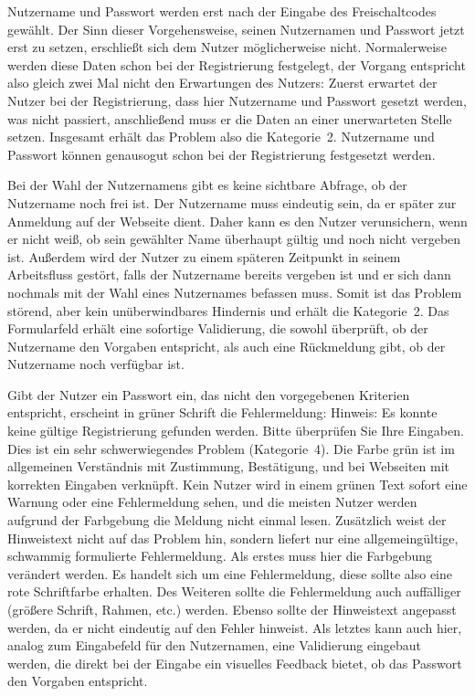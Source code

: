 {
Nutzername und Passwort werden erst nach der Eingabe des Freischaltcodes gewählt. 
}
{
Der Sinn dieser Vorgehensweise, seinen Nutzernamen und Passwort jetzt erst zu setzen, erschließt sich dem Nutzer möglicherweise nicht. Normalerweise werden diese Daten schon bei der Registrierung festgelegt, der Vorgang entspricht also gleich zwei Mal nicht den Erwartungen des Nutzers: Zuerst erwartet der Nutzer bei der Registrierung, dass hier Nutzername und Passwort gesetzt werden, was nicht passiert, anschließend muss er die Daten an einer unerwarteten Stelle setzen. Insgesamt erhält das Problem also die Kategorie~2.
}
{
Nutzername und Passwort können genausogut schon bei der Registrierung festgesetzt werden.
}
\label{prob:frei:nutzerundpw}

{
Bei der Wahl der Nutzernamens gibt es keine sichtbare Abfrage, ob der Nutzername noch frei ist.
}
{
Der Nutzername muss eindeutig sein, da er später zur Anmeldung auf der Webseite dient. Daher kann es den Nutzer verunsichern, wenn er nicht weiß, ob sein gewählter Name überhaupt gültig und noch nicht vergeben ist. Außerdem wird der Nutzer zu einem späteren Zeitpunkt in seinem Arbeitsfluss gestört, falls der Nutzername bereits vergeben ist und er sich dann nochmals mit der Wahl eines Nutzernames befassen muss. Somit ist das Problem störend, aber kein unüberwindbares Hindernis und erhält die Kategorie~2.
}
{
Das Formularfeld erhält eine sofortige Validierung, die sowohl überprüft, ob der Nutzername den Vorgaben entspricht, als auch eine Rückmeldung gibt, ob der Nutzername noch verfügbar ist.
}
\label{prob:frei:nutzerverfuegbar}

{
Gibt der Nutzer ein Passwort ein, das nicht den vorgegebenen Kriterien entspricht, erscheint in grüner Schrift die Fehlermeldung: \glqq Hinweis: Es konnte keine gültige Registrierung gefunden werden. Bitte überprüfen Sie Ihre Eingaben.\grqq
}
{
Dies ist ein sehr schwerwiegendes Problem (Kategorie~4). Die Farbe grün ist im allgemeinen Verständnis mit Zustimmung, Bestätigung, und bei Webseiten mit korrekten Eingaben verknüpft. Kein Nutzer wird in einem grünen Text sofort eine Warnung oder eine Fehlermeldung sehen, und die meisten Nutzer werden aufgrund der Farbgebung die Meldung nicht einmal lesen. Zusätzlich weist der Hinweistext nicht auf das Problem hin, sondern liefert nur eine allgemeingültige, schwammig formulierte Fehlermeldung.
}
{
Als erstes muss hier die Farbgebung verändert werden. Es handelt sich um eine Fehlermeldung, diese sollte also eine rote Schriftfarbe erhalten. Des Weiteren sollte die Fehlermeldung auch auffälliger (größere Schrift, Rahmen, etc.) werden. Ebenso sollte der Hinweistext angepasst werden, da er nicht eindeutig auf den Fehler hinweist. Als letztes kann auch hier, analog zum Eingabefeld für den Nutzernamen, eine Validierung eingebaut werden, die direkt bei der Eingabe ein visuelles Feedback bietet, ob das Passwort den Vorgaben entspricht.
}
\label{prob:frei:warntextgruen}


